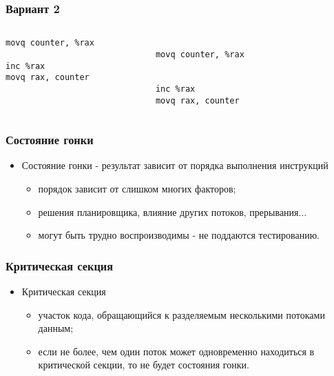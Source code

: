 \begin{frame}[fragile]
\frametitle{Вариант 2}
\begin{columns}
    \begin{column}{.35\textwidth}
        \begin{lstlisting}
movq counter, %rax

inc %rax
movq rax, counter
 
 
        \end{lstlisting}
    \end{column}
    \begin{column}{.35\textwidth}
        \begin{lstlisting}
 
movq counter, %rax
 
 
inc %rax
movq rax, counter
        \end{lstlisting}
    \end{column}
    \begin{column}{.3\textwidth}
    \end{column}
\end{columns}
\end{frame}

\begin{frame}
\frametitle{Состояние гонки}
\begin{itemize}
    \item<1->Состояние гонки - результат зависит от порядка выполнения
         инструкций
    \begin{itemize}
        \item<2->порядок зависит от слишком многих факторов;
        \item<3->решения планировщика, влияние других потоков, прерывания...
        \item<4->могут быть трудно воспроизводимы - не поддаются тестированию.
    \end{itemize}
\end{itemize}
\end{frame}

\begin{frame}
\frametitle{Критическая секция}
\begin{itemize}
    \item<1->Критическая секция
    \begin{itemize}
        \item<2->участок кода, обращающийся к разделяемым несколькими потоками
             данным;
        \item<3->если не более, чем один поток может одновременно находиться в
             критической секции, то не будет состояния гонки.
    \end{itemize}
\end{itemize}
\end{frame}


